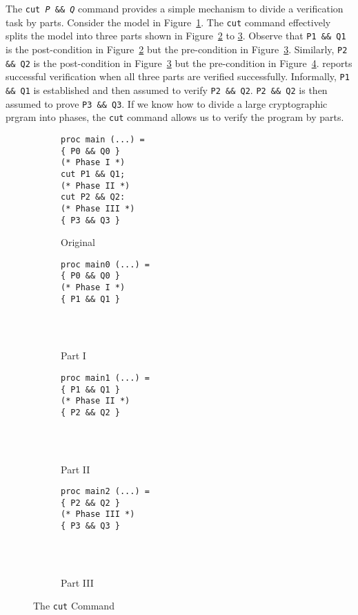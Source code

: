 \documentclass{amsproc}
\begin{document}
The \cryptoline \texttt{cut \textit{P} \&\& \textit{Q}} command
provides a simple mechanism to divide a verification task by
parts. Consider the \cryptoline model in
Figure~\ref{figure:cut:original}. The \texttt{cut} command effectively
splits the model into three parts shown in Figure~\ref{figure:cut:i}
to \ref{figure:cut:ii}. Observe that \texttt{P1 \&\& Q1} is the
post-condition in Figure~\ref{figure:cut:i} but the pre-condition in
Figure~\ref{figure:cut:ii}. Similarly, \texttt{P2 \&\& Q2} is the
post-condition in Figure~\ref{figure:cut:ii} but the pre-condition in
Figure~\ref{figure:cut:iii}. \cryptoline reports successful
verification when all three parts are verified successfully.
Informally, \texttt{P1 \&\& Q1} is established and then assumed to
verify \texttt{P2 \&\& Q2}. \texttt{P2 \&\& Q2} is then assumed to
prove \texttt{P3 \&\& Q3}. If we know how to divide a large
cryptographic prgram into phases, the \texttt{cut} command allows us
to verify the program by parts.

\begin{figure}
  \centering
  \begin{subfigure}{.24\columnwidth}
\begin{verbatim}
proc main (...) =
{ P0 && Q0 }
(* Phase I *)
cut P1 && Q1;
(* Phase II *)
cut P2 && Q2:
(* Phase III *)
{ P3 && Q3 }
\end{verbatim}
  \caption{Original}
  \label{figure:cut:original}
  \end{subfigure}
  \begin{subfigure}{.24\columnwidth}
\begin{verbatim}
proc main0 (...) =
{ P0 && Q0 }
(* Phase I *)
{ P1 && Q1 }




\end{verbatim}
  \caption{Part I}
  \label{figure:cut:i}
  \end{subfigure}
  \begin{subfigure}{.24\columnwidth}
\begin{verbatim}
proc main1 (...) =
{ P1 && Q1 }
(* Phase II *)
{ P2 && Q2 }




\end{verbatim}
  \caption{Part II}
  \label{figure:cut:ii}
  \end{subfigure}
  \begin{subfigure}{.24\columnwidth}
\begin{verbatim}
proc main2 (...) =
{ P2 && Q2 }
(* Phase III *)
{ P3 && Q3 }




\end{verbatim}
  \caption{Part III}
  \label{figure:cut:iii}
  \end{subfigure}
  \caption{The \cryptoline \texttt{cut} Command}
  \label{figure:cut}
\end{figure}
\end{document}
